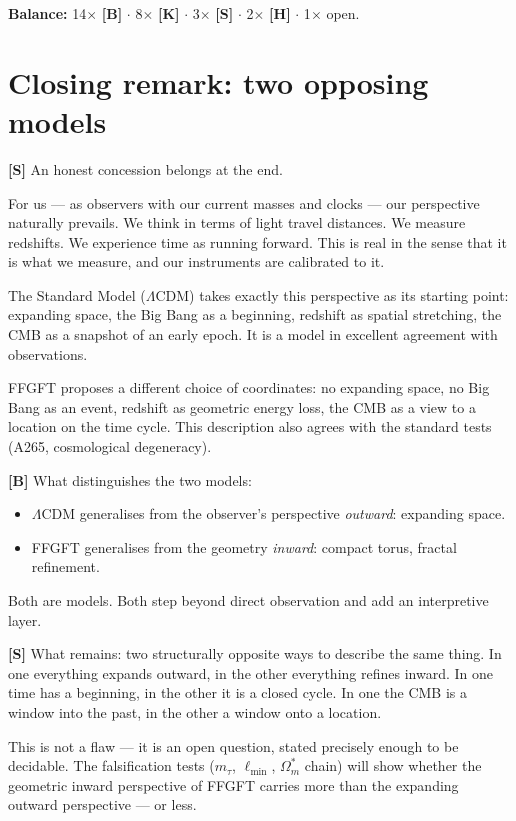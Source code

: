 \textbf{Balance:} 14$\times$ \textbf{[B]} $\cdot$
8$\times$ \textbf{[K]} $\cdot$
3$\times$ \textbf{[S]} $\cdot$
2$\times$ \textbf{[H]} $\cdot$
1$\times$ open.

\section{Closing remark: two opposing models}

\textbf{[S]} An honest concession belongs at the end.

For us --- as observers with our current masses and clocks ---
our perspective naturally prevails. We think in terms of light travel
distances. We measure redshifts. We experience time as running forward.
This is real in the sense that it is what we measure, and our
instruments are calibrated to it.

The Standard Model ($\Lambda$CDM) takes exactly this perspective as its
starting point: expanding space, the Big Bang as a beginning,
redshift as spatial stretching, the CMB as a snapshot of an early epoch.
It is a model in excellent agreement with observations.

FFGFT proposes a different choice of coordinates: no expanding space,
no Big Bang as an event, redshift as geometric energy loss, the CMB
as a view to a location on the time cycle. This description also agrees
with the standard tests (A265, cosmological degeneracy).

\textbf{[B]} What distinguishes the two models:

\begin{itemize}[leftmargin=1.4em,itemsep=0.2em]
  \item $\Lambda$CDM generalises from the observer's perspective
        \emph{outward}: expanding space.
  \item FFGFT generalises from the geometry \emph{inward}:
        compact torus, fractal refinement.
\end{itemize}

Both are models. Both step beyond direct observation and add an
interpretive layer.

\textbf{[S]} What remains: two structurally opposite ways to describe
the same thing. In one everything expands outward, in the other
everything refines inward. In one time has a beginning, in the other
it is a closed cycle. In one the CMB is a window into the past, in
the other a window onto a location.

This is not a flaw --- it is an open question, stated precisely
enough to be decidable. The falsification tests ($m_\tau$,
$\ell_\text{min}$, $\Omega_m^*$ chain) will show whether the
geometric inward perspective of FFGFT carries more than the expanding
outward perspective --- or less.

